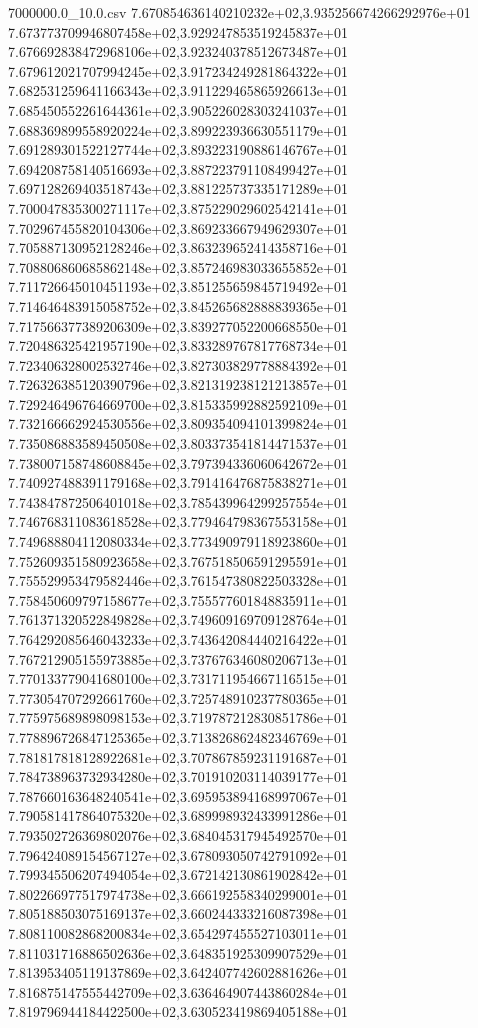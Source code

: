 \begin{filecontents*}{7000000.0_10.0.csv}
7.670854636140210232e+02,3.935256674266292976e+01
7.673773709946807458e+02,3.929247853519245837e+01
7.676692838472968106e+02,3.923240378512673487e+01
7.679612021707994245e+02,3.917234249281864322e+01
7.682531259641166343e+02,3.911229465865926613e+01
7.685450552261644361e+02,3.905226028303241037e+01
7.688369899558920224e+02,3.899223936630551179e+01
7.691289301522127744e+02,3.893223190886146767e+01
7.694208758140516693e+02,3.887223791108499427e+01
7.697128269403518743e+02,3.881225737335171289e+01
7.700047835300271117e+02,3.875229029602542141e+01
7.702967455820104306e+02,3.869233667949629307e+01
7.705887130952128246e+02,3.863239652414358716e+01
7.708806860685862148e+02,3.857246983033655852e+01
7.711726645010451193e+02,3.851255659845719492e+01
7.714646483915058752e+02,3.845265682888839365e+01
7.717566377389206309e+02,3.839277052200668550e+01
7.720486325421957190e+02,3.833289767817768734e+01
7.723406328002532746e+02,3.827303829778884392e+01
7.726326385120390796e+02,3.821319238121213857e+01
7.729246496764669700e+02,3.815335992882592109e+01
7.732166662924530556e+02,3.809354094101399824e+01
7.735086883589450508e+02,3.803373541814471537e+01
7.738007158748608845e+02,3.797394336060642672e+01
7.740927488391179168e+02,3.791416476875838271e+01
7.743847872506401018e+02,3.785439964299257554e+01
7.746768311083618528e+02,3.779464798367553158e+01
7.749688804112080334e+02,3.773490979118923860e+01
7.752609351580923658e+02,3.767518506591295591e+01
7.755529953479582446e+02,3.761547380822503328e+01
7.758450609797158677e+02,3.755577601848835911e+01
7.761371320522849828e+02,3.749609169709128764e+01
7.764292085646043233e+02,3.743642084440216422e+01
7.767212905155973885e+02,3.737676346080206713e+01
7.770133779041680100e+02,3.731711954667116515e+01
7.773054707292661760e+02,3.725748910237780365e+01
7.775975689898098153e+02,3.719787212830851786e+01
7.778896726847125365e+02,3.713826862482346769e+01
7.781817818128922681e+02,3.707867859231191687e+01
7.784738963732934280e+02,3.701910203114039177e+01
7.787660163648240541e+02,3.695953894168997067e+01
7.790581417864075320e+02,3.689998932433991286e+01
7.793502726369802076e+02,3.684045317945492570e+01
7.796424089154567127e+02,3.678093050742791092e+01
7.799345506207494054e+02,3.672142130861902842e+01
7.802266977517974738e+02,3.666192558340299001e+01
7.805188503075169137e+02,3.660244333216087398e+01
7.808110082868200834e+02,3.654297455527103011e+01
7.811031716886502636e+02,3.648351925309907529e+01
7.813953405119137869e+02,3.642407742602881626e+01
7.816875147555442709e+02,3.636464907443860284e+01
7.819796944184422500e+02,3.630523419869405188e+01

\end{filecontents*}
